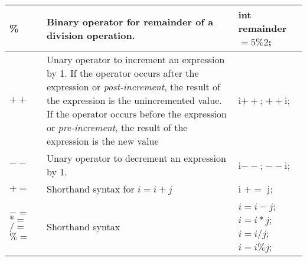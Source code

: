 \documentclass{article}
\begin{document}
\begin{center}
\begin{tabularx}{\textwidth}{
			| >{\raggedright\arraybackslash}X
			| >{\raggedright\arraybackslash}X
			| >{\raggedright\arraybackslash}X |
		}
		\hline
		\%                                              & Binary operator for remainder of a division operation.                                                                                                                                                                                                                                                  & int remainder $= 5 \% 2$;                                                      \\
		\hline
		$++$                                            & Unary operator to increment an expression by 1. If the operator occurs after the expression or \textit{post-increment}, the result of the expression is the unincremented value. If the operator occurs before the expression or \textit{pre-increment}, the result of the expression is the new value & i$++$; \newline $++$i;                                                       \\
		\hline
		$--$                                            & Unary operator to decrement an expression by 1.                                                                                                                                                                                                                                                         & i$--$; \newline $--$i;                                                       \\
		\hline
		$+=$                                            & Shorthand syntax for $i = i + j$                                                                                                                                                                                                                                                                          & i $+=$ j;                                                                    \\
		\hline
		$-=$ \newline $*=$ \newline $/=$ \newline $\%=$ & Shorthand syntax                                                                                                                                                                                                                                                                                        & $i = i - j$; \newline $i = i*j$; \newline $i= i / j$; \newline $i = i \% j$; \\

\end{tabularx}
\end{center}
\end{document}

